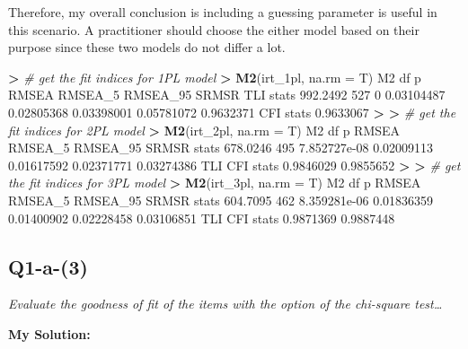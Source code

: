 \documentclass[
]{article}
\newenvironment{Shaded}{\begin{snugshade}}{\end{snugshade}}
\newcommand{\AttributeTok}[1]{\textcolor[rgb]{0.13,0.29,0.53}{#1}}
\newcommand{\CommentTok}[1]{\textcolor[rgb]{0.56,0.35,0.01}{\textit{#1}}}
\newcommand{\DecValTok}[1]{\textcolor[rgb]{0.00,0.00,0.81}{#1}}
\newcommand{\ErrorTok}[1]{\textcolor[rgb]{0.64,0.00,0.00}{\textbf{#1}}}
\newcommand{\FloatTok}[1]{\textcolor[rgb]{0.00,0.00,0.81}{#1}}
\newcommand{\FunctionTok}[1]{\textcolor[rgb]{0.13,0.29,0.53}{\textbf{#1}}}
\newcommand{\NormalTok}[1]{#1}
\newcommand{\SpecialCharTok}[1]{\textcolor[rgb]{0.81,0.36,0.00}{\textbf{#1}}}
\begin{document}
Therefore, my overall conclusion is including a guessing parameter is
useful in this scenario. A practitioner should choose the either model
based on their purpose since these two models do not differ a lot.

\begin{Shaded}
\begin{Highlighting}[]
\SpecialCharTok{\textgreater{}} \CommentTok{\# get the fit indices for 1PL model}
\ErrorTok{\textgreater{}} \FunctionTok{M2}\NormalTok{(irt\_1pl, }\AttributeTok{na.rm =}\NormalTok{ T)}
\NormalTok{            M2  df p      RMSEA    RMSEA\_5   RMSEA\_95      SRMSR       TLI}
\NormalTok{stats }\FloatTok{992.2492} \DecValTok{527} \DecValTok{0} \FloatTok{0.03104487} \FloatTok{0.02805368} \FloatTok{0.03398001} \FloatTok{0.05781072} \FloatTok{0.9632371}
\NormalTok{            CFI}
\NormalTok{stats }\FloatTok{0.9633067}
\SpecialCharTok{\textgreater{}} 
\ErrorTok{\textgreater{}} \CommentTok{\# get the fit indices for 2PL model}
\ErrorTok{\textgreater{}} \FunctionTok{M2}\NormalTok{(irt\_2pl, }\AttributeTok{na.rm =}\NormalTok{ T)}
\NormalTok{            M2  df            p      RMSEA    RMSEA\_5   RMSEA\_95      SRMSR}
\NormalTok{stats }\FloatTok{678.0246} \DecValTok{495} \FloatTok{7.852727e{-}08} \FloatTok{0.02009113} \FloatTok{0.01617592} \FloatTok{0.02371771} \FloatTok{0.03274386}
\NormalTok{            TLI       CFI}
\NormalTok{stats }\FloatTok{0.9846029} \FloatTok{0.9855652}
\SpecialCharTok{\textgreater{}} 
\ErrorTok{\textgreater{}} \CommentTok{\# get the fit indices for 3PL model}
\ErrorTok{\textgreater{}} \FunctionTok{M2}\NormalTok{(irt\_3pl, }\AttributeTok{na.rm =}\NormalTok{ T)}
\NormalTok{            M2  df            p      RMSEA    RMSEA\_5   RMSEA\_95      SRMSR}
\NormalTok{stats }\FloatTok{604.7095} \DecValTok{462} \FloatTok{8.359281e{-}06} \FloatTok{0.01836359} \FloatTok{0.01400902} \FloatTok{0.02228458} \FloatTok{0.03106851}
\NormalTok{            TLI       CFI}
\NormalTok{stats }\FloatTok{0.9871369} \FloatTok{0.9887448}
\end{Highlighting}
\end{Shaded}

\hypertarget{q1-a-3}{%
\subsection{Q1-a-(3)}\label{q1-a-3}}

\emph{Evaluate the goodness of fit of the items with the option of the
chi-square test\ldots{}}

\textbf{My Solution:}
\end{document}
